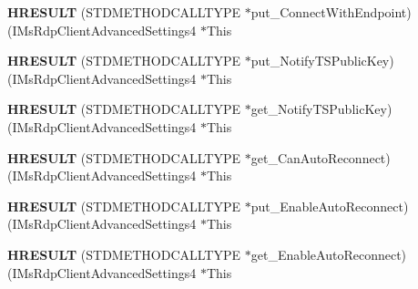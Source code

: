 \begin{DoxyCompactItemize}
\item 
\mbox{\label{struct_i_ms_rdp_client_advanced_settings4_vtbl_abda86e70b9a939cbeef56b661540d161}} 
{\bfseries H\+R\+E\+S\+U\+LT} (S\+T\+D\+M\+E\+T\+H\+O\+D\+C\+A\+L\+L\+T\+Y\+PE $\ast$put\+\_\+\+Connect\+With\+Endpoint)(I\+Ms\+Rdp\+Client\+Advanced\+Settings4 $\ast$This
\item 
\mbox{\label{struct_i_ms_rdp_client_advanced_settings4_vtbl_a2942ca61fd0ad78eabaac04817cdd517}} 
{\bfseries H\+R\+E\+S\+U\+LT} (S\+T\+D\+M\+E\+T\+H\+O\+D\+C\+A\+L\+L\+T\+Y\+PE $\ast$put\+\_\+\+Notify\+T\+S\+Public\+Key)(I\+Ms\+Rdp\+Client\+Advanced\+Settings4 $\ast$This
\item 
\mbox{\label{struct_i_ms_rdp_client_advanced_settings4_vtbl_abf9ccdb92b9bea5b9808a5edf5e2e900}} 
{\bfseries H\+R\+E\+S\+U\+LT} (S\+T\+D\+M\+E\+T\+H\+O\+D\+C\+A\+L\+L\+T\+Y\+PE $\ast$get\+\_\+\+Notify\+T\+S\+Public\+Key)(I\+Ms\+Rdp\+Client\+Advanced\+Settings4 $\ast$This
\item 
\mbox{\label{struct_i_ms_rdp_client_advanced_settings4_vtbl_adb410c1e7758a88ce4365e016a21bcd1}} 
{\bfseries H\+R\+E\+S\+U\+LT} (S\+T\+D\+M\+E\+T\+H\+O\+D\+C\+A\+L\+L\+T\+Y\+PE $\ast$get\+\_\+\+Can\+Auto\+Reconnect)(I\+Ms\+Rdp\+Client\+Advanced\+Settings4 $\ast$This
\item 
\mbox{\label{struct_i_ms_rdp_client_advanced_settings4_vtbl_acbe4bada79dda2a4ccc0d4aa5453331b}} 
{\bfseries H\+R\+E\+S\+U\+LT} (S\+T\+D\+M\+E\+T\+H\+O\+D\+C\+A\+L\+L\+T\+Y\+PE $\ast$put\+\_\+\+Enable\+Auto\+Reconnect)(I\+Ms\+Rdp\+Client\+Advanced\+Settings4 $\ast$This
\item 
\mbox{\label{struct_i_ms_rdp_client_advanced_settings4_vtbl_af9a0f5d3df3374a7f67ecb3670e949c7}} 
{\bfseries H\+R\+E\+S\+U\+LT} (S\+T\+D\+M\+E\+T\+H\+O\+D\+C\+A\+L\+L\+T\+Y\+PE $\ast$get\+\_\+\+Enable\+Auto\+Reconnect)(I\+Ms\+Rdp\+Client\+Advanced\+Settings4 $\ast$This
\item 
\mbox{\label{struct_i_ms_rdp_client_advanced_settings4_vtbl_aecf91a47919a2402b5cbbcd9285dd253}} 

\end{DoxyCompactItemize}
